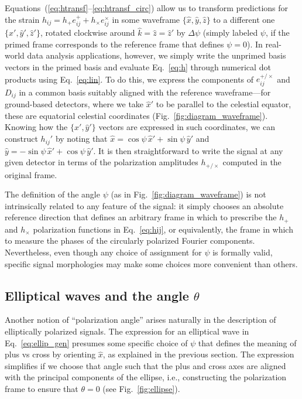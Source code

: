 \documentclass[aps,prd,twocolumn,superscriptaddress,preprintnumbers,floatfix,nofootinbib]{revtex4-2}
\newcommand*{\eq}[1]{Eq.~\eqref{eq:#1}}
\begin{document}
Equations~(\ref{eq:htransf}--\ref{eq:htransf_circ}) allow us to transform predictions for the strain $h_{ij} = h_+ e^{+}_{ij} + h_{\times} e^{\times}_{ij}$ in some waveframe $\{\hat{x}, \hat{y}, \hat{z}\}$ to a different one $\{\hat{x}', \hat{y}', \hat{z}'\}$, rotated clockwise around $\hat{k}=\hat{z}=\hat{z}'$ by $\Delta \psi$ (simply labeled $\psi$, if the primed frame corresponds to the reference frame that defines $\psi=0$).
In real-world data analysis applications, however, we simply write the unprimed basis vectors in the primed basis and evaluate \eq{h} through numerical dot products using \eq{lin}.
To do this, we express the components of $e^{+/\times}_{ij}$ and $D_{ij}$ in a common basis suitably aligned with the reference waveframe---for ground-based detectors, where we take $\hat{x}'$ to be parallel to the celestial equator, these are equatorial celestial coordinates (Fig.~\ref{fig:diagram_waveframe}).
Knowing how the $\{\hat{x}', \hat{y}'\}$ vectors are expressed in such coordinates, we can construct $h_{ij}'$ by noting that $\hat{x} = \cos\psi\, \hat{x}' + \sin\psi\, \hat{y}'$ and $\hat{y}= - \sin\psi\, \hat{x}' + \cos\psi\, \hat{y}'$.
It is then straightforward to write the signal at any given detector in terms of the polarization amplitudes $h_{+/\times}$ computed in the original frame.

The definition of the angle $\psi$ (as in Fig.~\ref{fig:diagram_waveframe}) is not intrinsically related to any feature of the signal: it simply chooses an absolute reference direction that defines an arbitrary frame in which to prescribe the $h_+$ and $h_\times$ polarization functions in \eq{hij}, or equivalently, the frame in which to measure the phases of the circularly polarized Fourier components.
Nevertheless, even though any choice of assignment for $\psi$ is formally valid, specific signal morphologies may make some choices more convenient than others.

\subsection{Elliptical waves and the angle $\theta$}
\label{sec:theta}

Another notion of ``polarization angle'' arises naturally in the description of elliptically polarized signals.
The expression for an elliptical wave in \eq{ellip_gen} presumes some specific choice of $\psi$ that defines the meaning of plus vs cross by orienting $\hat{x}$, as explained in the previous section.
The expression simplifies if we choose that angle such that the plus and cross axes are aligned with the principal components of the ellipse, i.e., constructing the polarization frame to ensure that $\theta = 0$ (see Fig.~\ref{fig:ellipse}).
\end{document}
